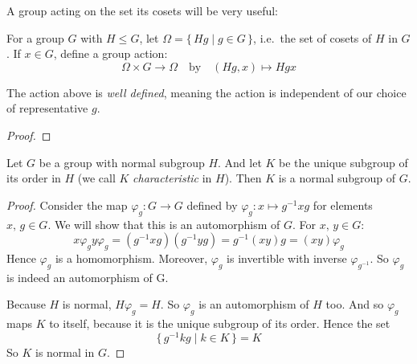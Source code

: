 A group acting on the set its cosets will be very useful:

\begin{definition}
    For a group \(G\) with \(H \leqslant G\), let \(\Omega = \{\,Hg \mid g \in G\,\}\), i.e.\ the set of cosets of \(H\)
    in \(G\).
    If \(x \in G\), define a group action:
    \[\Omega \times G \to \Omega \quad \text{by} \quad (Hg, x) \mapsto Hgx\]
\end{definition}

\begin{lemma}
    The action above is \emph{well defined}, meaning the action is independent of our choice of representative \(g\).
\end{lemma}

\begin{proof}
\end{proof}

\begin{lemma}\label{lem:char}
    Let \(G\) be a group with normal subgroup \(H\).
    And let \(K\) be the unique subgroup of its order in \(H\) (we call \(K\) \emph{characteristic} in \(H\)).
    Then \(K\) is a normal subgroup of \(G\).
\end{lemma}

\begin{proof}
    Consider the map \(\varphi_g:G \to G\) defined by \(\varphi_g:x \mapsto g^{-1}xg\) for elements \(x,\,g \in G\).
    We will show that this is an automorphism of \(G\).
    For \(x,\,y \in G\):
    \[x\varphi_g y\varphi_g = (g^{-1}xg)(g^{-1}yg) = g^{-1}(xy)g = (xy)\varphi_g\]
    Hence \(\varphi_g\) is a homomorphism.
    Moreover, \(\varphi_g\) is invertible with inverse \(\varphi_{g^{-1}}\).
    So \(\varphi_g\) is indeed an automorphism of G.

    Because \(H\) is normal, \(H\varphi_g = H\).
    So \(\varphi_g\) is an automorphism of \(H\) too.
    And so \(\varphi_g\) maps \(K\) to itself, because it is the unique subgroup of its order.
    Hence the set
    \[\{\,g^{-1}kg \mid k \in K\,\} = K\]
    So \(K\) is normal in \(G\).
\end{proof}

